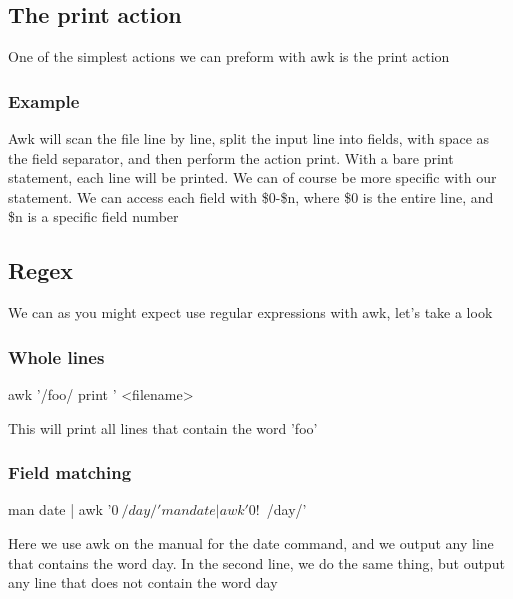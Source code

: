 \documentclass{report}
\begin{document}
    \subsection{The print action}
    \bigbreak \noindent 
    One of the simplest actions we can preform with awk is the print action
    \bigbreak \noindent 
    \subsubsection{Example}
    \bigbreak \noindent 
    \bigbreak \noindent 
    Awk will scan the file line by line, split the input line into fields, with space as the field separator, and then perform the action print. With a bare print statement, each line will be printed. We can of course be more specific with our statement. We can access each field with \$0-\$n, where \$0 is the entire line, and  \$n is a specific field number

    \bigbreak \noindent 
    \subsection{Regex}
    \bigbreak \noindent 
    We can as you might expect use regular expressions with awk, let's take a look 
    \bigbreak \noindent 
    \subsubsection{Whole lines}
    \bigbreak \noindent 
    \begin{bashcode}
        awk '/foo/ { print }' <filename>
    \end{bashcode}
    \bigbreak \noindent 
    This will print all lines that contain the word 'foo'

    \bigbreak \noindent 
    \subsubsection{Field matching}
    \bigbreak \noindent 
    \begin{bashcode}
        man date | awk '$0~/day/'
        man date | awk '$0!~/day/'
    \end{bashcode}
    \bigbreak \noindent 
    Here we use awk on the manual for the date command, and we output any line that contains the word day. In the second line, we do the same thing, but output any line that does not contain the word day
\end{document}
